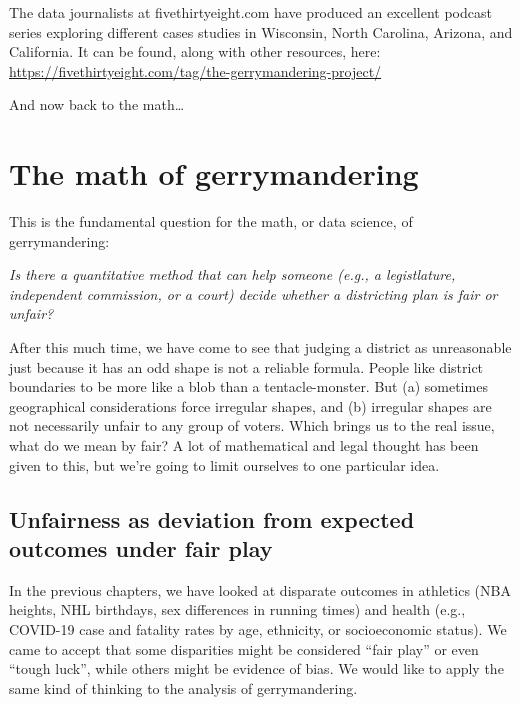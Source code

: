 \documentclass[
  openany]{book}
\begin{document}
The data journalists at fivethirtyeight.com have produced an excellent podcast series exploring different cases studies in Wisconsin, North Carolina, Arizona, and California. It can be found, along with other resources, here:
\url{https://fivethirtyeight.com/tag/the-gerrymandering-project/}

And now back to the math\ldots{}

\hypertarget{the-math-of-gerrymandering}{%
\section*{The math of gerrymandering}\label{the-math-of-gerrymandering}}

This is the fundamental question for the math, or data science, of gerrymandering:

\emph{Is there a quantitative method that can help someone (e.g., a legistlature, independent commission, or a court) decide whether a districting plan is fair or unfair?}

After this much time, we have come to see that judging a district as unreasonable just because it has an odd shape is not a reliable formula. People like district boundaries to be more like a blob than a tentacle-monster. But (a) sometimes geographical considerations force irregular shapes, and (b) irregular shapes are not necessarily unfair to any group of voters. Which brings us to the real issue, what do we mean by fair? A lot of mathematical and legal thought has been given to this, but we're going to limit ourselves to one particular idea.

\hypertarget{unfairness-as-deviation-from-expected-outcomes-under-fair-play}{%
\subsection*{Unfairness as deviation from expected outcomes under fair play}\label{unfairness-as-deviation-from-expected-outcomes-under-fair-play}}

In the previous chapters, we have looked at disparate outcomes in athletics (NBA heights, NHL birthdays, sex differences in running times) and health (e.g., COVID-19 case and fatality rates by age, ethnicity, or socioeconomic status). We came to accept that some disparities might be considered ``fair play'' or even ``tough luck'', while others might be evidence of bias.
We would like to apply the same kind of thinking to the analysis of gerrymandering.
\end{document}

